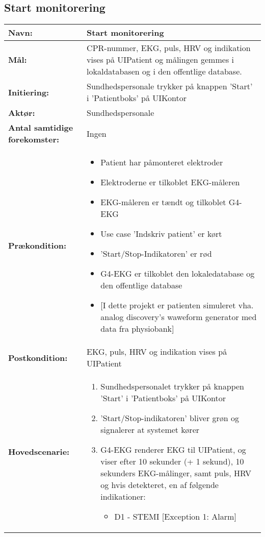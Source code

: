 \subsection{Start monitorering}
\begin{table}[H]
\begin{tabular}{|l|p{10cm}|}
\hline
\textbf{Navn:} & \textbf{Start monitorering}\\\hline
\textbf{Mål:} & CPR-nummer, EKG, puls, HRV og indikation vises på UIPatient og målingen gemmes i lokaldatabasen og i den offentlige database. \\\hline
\textbf{Initiering:} & Sundhedspersonale trykker på knappen 'Start' i 'Patientboks' på UIKontor \\\hline
\textbf{Aktør:} & Sundhedspersonale \\\hline
\textbf{Antal samtidige forekomster:} & Ingen \\\hline
\textbf{Prækondition:} & \begin{itemize}[label=$\circ$]
\item{Patient har påmonteret elektroder}
\item{Elektroderne er tilkoblet EKG-måleren}
\item{EKG-måleren er tændt og tilkoblet G4-EKG}
\item{Use case 'Indskriv patient' er kørt}
\item{'Start/Stop-Indikatoren' er rød}
\item{G4-EKG er tilkoblet den lokaledatabase og den offentlige database}
\item{[I dette projekt er patienten simuleret vha. analog discovery's waweform generator med data fra physiobank] }
\end{itemize}
\\\hline
\textbf{Postkondition:} & EKG, puls, HRV og indikation vises på UIPatient \\\hline
\textbf{Hovedscenarie:} &
{\begin{enumerate}
\item{Sundhedspersonalet trykker på knappen 'Start' i 'Patientboks' på UIKontor}
\item{'Start/Stop-indikatoren' bliver grøn og signalerer at systemet kører} 
\item{G4-EKG renderer EKG til UIPatient, og viser efter 10 sekunder (+ 1 sekund), 10 sekunders EKG-målinger, samt puls, HRV og hvis detekteret, en af følgende indikationer: {\begin{itemize}[label=$\circ$]
\item {D1 - STEMI}  [Exception 1: Alarm]

\end{itemize}}}
\end{enumerate}}
\end{tabular}
\end{table}

